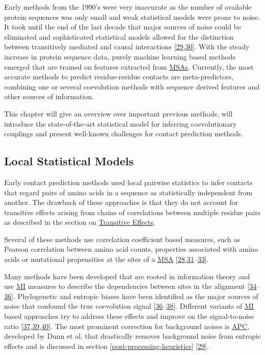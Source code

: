 \documentclass[12pt,a4paper,twoside]{book}
\theoremstyle{definition}
\theoremstyle{definition}
\theoremstyle{remark}
\begin{document}
Early methods from the 1990's were very inaccurate as the number of
available protein sequences was only small and weak statistical models
were prone to noise. It took until the end of the last decade that major
sources of noise could be eliminated and sophisticated statistical
models allowed for the distinction between transitively mediated and
causal interactions
{[}\protect\hyperlink{ref-Dunn2008}{29},\protect\hyperlink{ref-Weigt2009}{30}{]}.
With the steady increase in protein sequence data, purely machine
learning based methods emerged that are trained on features extracted
from \protect\hyperlink{abbrev}{MSAs}. Currently, the most accurate
methods to predict residue-residue contacts are meta-predictors,
combining one or several coevolution methods with sequence derived
features and other sources of information.

This chapter will give an overview over important previous methods, will
introduce the state-of-the-art statistical model for inferring
coevolutionary couplings and present well-known challenges for contact
prediction methods.

\subsection{Local Statistical Models}\label{local-methods}

Early contact prediction methods used local pairwise statistics to infer
contacts that regard pairs of amino acids in a sequence as statistically
independent from another. The drawback of these approaches is that they
do not account for transitive effects arising from chains of
correlations between multiple residue pairs as described in the section
on \protect\hyperlink{transitive-effects}{Transitive Effects}.

Several of these methods use correlation coefficient based measures,
such as Pearson correlation between amino acid counts, properties
associated with amino acids or mutational propensities at the sites of a
\protect\hyperlink{abbrev}{MSA}
{[}\protect\hyperlink{ref-Gobel1994}{28},\protect\hyperlink{ref-Neher1994}{31}--\protect\hyperlink{ref-Oliveira2002}{33}{]}.

Many methods have been developed that are rooted in information theory
and use \protect\hyperlink{abbrev}{MI} measures to describe the
dependencies between sites in the alignment
{[}\protect\hyperlink{ref-Clarke1995}{34}--\protect\hyperlink{ref-Martin2005}{36}{]}.
Phylogenetic and entropic biases have been identified as the major
sources of noise that confound the true coevolution signal
{[}\protect\hyperlink{ref-Martin2005}{36}--\protect\hyperlink{ref-Fodor2004}{38}{]}.
Different variants of \protect\hyperlink{abbrev}{MI} based approaches
try to address these effects and improve on the signal-to-noise ratio
{[}\protect\hyperlink{ref-Atchley2000}{37},\protect\hyperlink{ref-Tillier2003}{39},\protect\hyperlink{ref-Gouveia_Oliveira2007}{40}{]}.
The most prominent correction for background noises is
\protect\hyperlink{abbrev}{APC}, developed by Dunn et al. that
drastically removes background noise from entropic effects and is
discussed in section \ref{post-processing-heuristics}
{[}\protect\hyperlink{ref-Dunn2008}{29}{]}.
\end{document}
